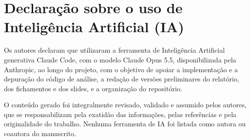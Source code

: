 \chapter{Declaração sobre o uso de Inteligência Artificial (IA)}
\label{ap:uso-de-ia}

Os autores declaram que utilizaram a ferramenta de Inteligência Artificial
generativa Claude Code, com o modelo Claude Opus 5.5, disponibilizada pela
Anthropic, ao longo do projeto, com o objetivo de apoiar a
implementação e a depuração do código de análise, a redação de versões
preliminares do relatório, dos fichamentos e dos slides, e a organização do
repositório.

O conteúdo gerado foi integralmente revisado, validado e assumido pelos autores,
que se responsabilizam pela exatidão das informações, pelas referências e pela
originalidade do trabalho. Nenhuma ferramenta de IA foi listada como autora ou
coautora do manuscrito.
